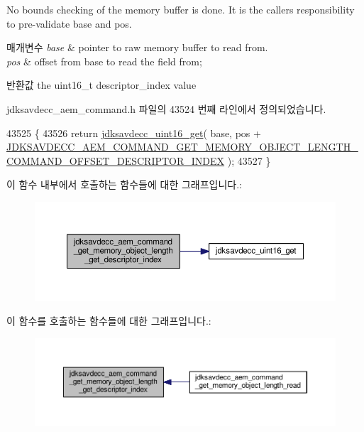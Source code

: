 No bounds checking of the memory buffer is done. It is the caller\textquotesingle{}s responsibility to pre-\/validate base and pos.


\begin{DoxyParams}{매개변수}
{\em base} & pointer to raw memory buffer to read from. \\
\hline
{\em pos} & offset from base to read the field from; \\
\hline
\end{DoxyParams}
\begin{DoxyReturn}{반환값}
the uint16\+\_\+t descriptor\+\_\+index value 
\end{DoxyReturn}


jdksavdecc\+\_\+aem\+\_\+command.\+h 파일의 43524 번째 라인에서 정의되었습니다.


\begin{DoxyCode}
43525 \{
43526     \textcolor{keywordflow}{return} \hyperlink{group__endian_ga3fbbbc20be954aa61e039872965b0dc9}{jdksavdecc\_uint16\_get}( base, pos + 
      \hyperlink{group__command__get__memory__object__length_gaef3672ace9ef9c1ddf37bfacdd009df0}{JDKSAVDECC\_AEM\_COMMAND\_GET\_MEMORY\_OBJECT\_LENGTH\_COMMAND\_OFFSET\_DESCRIPTOR\_INDEX}
       );
43527 \}
\end{DoxyCode}


이 함수 내부에서 호출하는 함수들에 대한 그래프입니다.\+:
\nopagebreak
\begin{figure}[H]
\begin{center}
\leavevmode
\includegraphics[width=350pt]{group__command__get__memory__object__length_ga91ac697db77b7a0ce5a223a9e879a5a4_cgraph}
\end{center}
\end{figure}




이 함수를 호출하는 함수들에 대한 그래프입니다.\+:
\nopagebreak
\begin{figure}[H]
\begin{center}
\leavevmode
\includegraphics[width=350pt]{group__command__get__memory__object__length_ga91ac697db77b7a0ce5a223a9e879a5a4_icgraph}
\end{center}
\end{figure}


